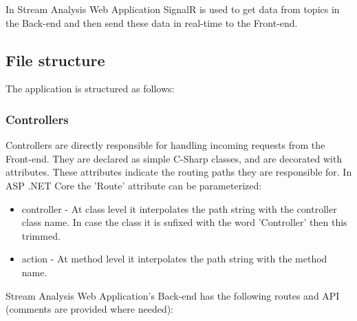 In Stream Analysis Web Application SignalR is used to get data from topics in the Back-end and then send these data in real-time to the Front-end.

\subsection{File structure}
\label{chap:04:02:03}

The application is structured as follows:


\subsubsection{Controllers}
\label{chap:04:02:03:01}
Controllers are directly responsible for handling incoming requests from the Front-end. They are declared as simple C-Sharp classes, and are decorated with attributes. These attributes indicate the routing paths they are responsible for. In ASP .NET Core the 'Route' attribute can be parameterized:

\begin{itemize}
	\item controller - At class level it interpolates the path string with the controller class name. In case the class it is sufixed with the word 'Controller' then this trimmed.
	\item action - At method level it interpolates the path string with the method name.
\end{itemize}

Stream Analysis Web Application's Back-end has the following routes and API (comments are provided where needed):\\

